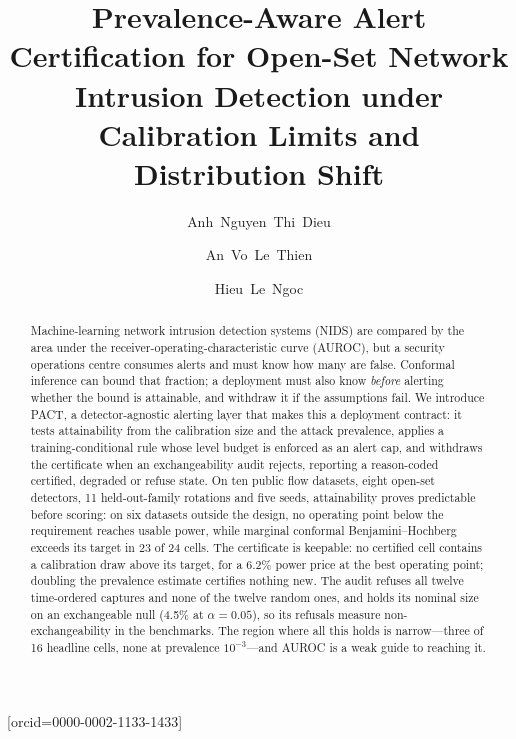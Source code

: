 \documentclass[a4paper,fleqn]{cas-dc}
\newcommand{\PACT}{PACT\xspace}
\begin{document}
\let\WriteBookmarks\relax
\def\floatpagepagefraction{1}
\def\textpagefraction{.001}


\title[mode=title]{Prevalence-Aware Alert Certification for Open-Set Network
Intrusion Detection under Calibration Limits and Distribution Shift}

\author[1]{Anh~Nguyen~Thi~Dieu}

\author[2]{An~Vo~Le~Thien}

\author[3]{Hieu~Le~Ngoc}[orcid=0000-0002-1133-1433]
\cormark[1]



\begin{abstract}
Machine-learning network intrusion detection systems (NIDS) are compared by the
area under the receiver-operating-characteristic curve (AUROC), but a security
operations centre consumes alerts and must know how many are false.
Conformal inference can bound that fraction; a deployment must also know
\emph{before} alerting whether the bound is attainable, and withdraw it if the
assumptions fail. We introduce \PACT, a detector-agnostic alerting layer that
makes this a deployment contract: it tests attainability from the calibration
size and the attack prevalence, applies a training-conditional rule whose level
budget is enforced as an alert cap, and withdraws the certificate when an
exchangeability audit rejects, reporting a reason-coded certified,
degraded or refuse state. On ten public flow datasets, eight open-set detectors, 11
held-out-family rotations and five seeds, attainability proves predictable
before scoring: on six datasets outside the design, no operating point
below the requirement reaches usable power, while marginal conformal
Benjamini--Hochberg exceeds its target in 23 of 24 cells. The certificate is
keepable: no certified cell contains a calibration draw above its target, for a
6.2\% power price at the best operating point; doubling the prevalence
estimate certifies nothing new. The audit refuses all twelve time-ordered
captures and none of the twelve random ones, and holds its nominal size on an
exchangeable null (4.5\% at $\alpha=0.05$), so its refusals measure
non-exchangeability in the benchmarks. The region where all this holds is
narrow---three of 16 headline cells, none at prevalence $10^{-3}$---and AUROC is
a weak guide to reaching it.
\end{abstract}
\end{document}
